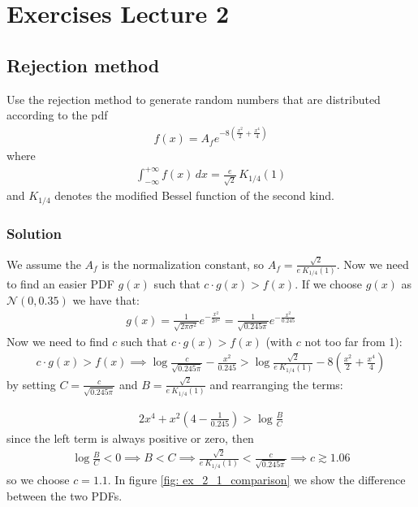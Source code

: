 \documentclass[../main.tex]{subfiles}
\begin{document}
\chapter{Exercises Lecture 2}

\section{Rejection method}
Use the rejection method to generate random numbers that are distributed according to the pdf 
\begin{align}
    f(x) = A_f e^{-8 \left(\frac{x^2}{2} + \frac{x^4}{4} \right)}
\end{align}
where
\begin{align}
    \int_{-\infty}^{+\infty} f(x) \, dx = \frac{e}{\sqrt{2}} \, K_{1/4}(1)
\end{align}
and $ K_{1/4}$ denotes the modified Bessel function of the second kind.

\subsection{Solution}
We assume the $A_f$ is the normalization constant, so $A_f = \frac{\sqrt{2}}{e\ K_{1/4}(1)}$. Now we need to find an easier PDF $g(x)$ such that $c\cdot g(x) > f(x)$. If we choose $g(x)$ as $\mathcal{N}(0, 0.35)$ we have that:
\begin{align}
   g(x) = \frac{1}{\sqrt{2\pi\sigma^2}} e^{-\frac{x^2}{2\sigma^2}} = \frac{1}{\sqrt{0.245\pi}} e^{-\frac{x^2}{0.245}}
\end{align}
Now we need to find $c$ such that $c\cdot g(x) > f(x)$ (with $c$ not too far from 1):
\begin{align}
   c\cdot g(x) > f(x) \implies \log{\frac{c}{\sqrt{0.245\pi}}} -\frac{x^2}{0.245} > \log{\frac{\sqrt{2}}{e\ K_{1/4}(1)}} - 8 \left(\frac{x^2}{2} + \frac{x^4}{4} \right)
\end{align} by setting $C = \frac{c}{\sqrt{0.245\pi}}$ and $B = \frac{\sqrt{2}}{e\ K_{1/4}(1)}$ and rearranging the terms:

\begin{align}
  2x^4 + x^2\left(4 - \frac{1}{0.245}\right) > \log{\frac{B}{C}}
\end{align}since the left term is always positive or zero, then
\begin{align}
  \log{\frac{B}{C}} < 0 \implies B < C \implies \frac{\sqrt{2}}{e\ K_{1/4}(1)} <  \frac{c}{\sqrt{0.245\pi}} \implies c \gtrsim 1.06
\end{align} so we choose $c=1.1$. In figure \ref{fig: ex_2_1_comparison} we show the difference between the two PDFs.
\end{document}

